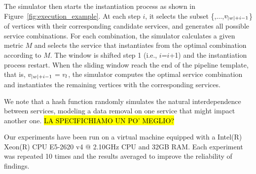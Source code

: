 The simulator then starts the instantiation process as shown in Figure~\ref{fig:execution_example}. At each step $i$, it selects the subset \{,$\ldots$,$v_{|w|+i-1}$\} of vertices with their corresponding candidate services, and generates all possible service combinations. For each combination, the simulator calculates a given metric $M$ and selects the service that instantiates  from the optimal combination according to $M$. The window is shifted step 1 (i.e., $i$=$i$+1) and the instantiation process restart. When the sliding window reach the end of the pipeline template, that is, $v_{|w|+i-1}$$=$$v_{l}$, the simulator computes the optimal service combination and instantiates the remaining vertices with the corresponding services.

We note that a hash function randomly simulates the natural interdependence between services, modeling a data removal on one service that might impact another one. \hl{LA SPECIFICHIAMO UN PO' MEGLIO?} %

Our experiments have been run on a virtual machine equipped with a Intel(R) Xeon(R) CPU E5-2620 v4 @ 2.10GHz CPU and 32GB RAM.
Each experiment was repeated 10 times and the results averaged to improve the reliability of findings.

